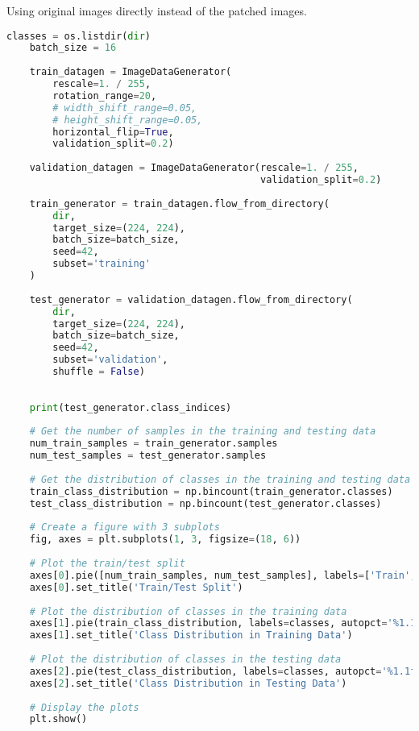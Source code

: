 Using original images directly instead of the patched images.
\begin{lstlisting}[language=Python]
    classes = os.listdir(dir)
    batch_size = 16
    
    train_datagen = ImageDataGenerator(
        rescale=1. / 255,
        rotation_range=20,
        # width_shift_range=0.05,
        # height_shift_range=0.05,
        horizontal_flip=True,
        validation_split=0.2)
    
    validation_datagen = ImageDataGenerator(rescale=1. / 255,
                                            validation_split=0.2)
    
    train_generator = train_datagen.flow_from_directory(
        dir,
        target_size=(224, 224),
        batch_size=batch_size,
        seed=42,
        subset='training'
    )
    
    test_generator = validation_datagen.flow_from_directory(
        dir,
        target_size=(224, 224),
        batch_size=batch_size,
        seed=42,
        subset='validation',
        shuffle = False)
    
    
    print(test_generator.class_indices)
    
    # Get the number of samples in the training and testing data
    num_train_samples = train_generator.samples
    num_test_samples = test_generator.samples
    
    # Get the distribution of classes in the training and testing data
    train_class_distribution = np.bincount(train_generator.classes)
    test_class_distribution = np.bincount(test_generator.classes)
    
    # Create a figure with 3 subplots
    fig, axes = plt.subplots(1, 3, figsize=(18, 6))
    
    # Plot the train/test split
    axes[0].pie([num_train_samples, num_test_samples], labels=['Train', 'Test'], autopct='%1.1f%%')
    axes[0].set_title('Train/Test Split')
    
    # Plot the distribution of classes in the training data
    axes[1].pie(train_class_distribution, labels=classes, autopct='%1.1f%%')
    axes[1].set_title('Class Distribution in Training Data')
    
    # Plot the distribution of classes in the testing data
    axes[2].pie(test_class_distribution, labels=classes, autopct='%1.1f%%')
    axes[2].set_title('Class Distribution in Testing Data')
    
    # Display the plots
    plt.show()
\end{lstlisting}


